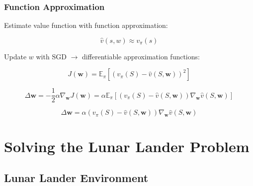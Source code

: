 \documentclass{beamer}
\begin{document}
\begin{frame}
\frametitle{Function Approximation}

Estimate value function with function approximation:

$$
\hat{v}(s, w) \approx v_{\pi}(s)
$$

Update $w$ with SGD $\rightarrow$ differentiable 
approximation functions:

$$
J(\mathbf{w})=\mathbb{E}_{\pi}\left[\left(v_{\pi}(S)-\hat{v}(S, \mathbf{w})\right)^{2}\right]
$$

$$
\Delta \mathbf{w} =-\frac{1}{2} \alpha \nabla_{\mathbf{w}} J(\mathbf{w})
 =\alpha \mathbb{E}_{\pi}\left[\left(v_{\pi}(S)-\hat{v}(S, \mathbf{w})\right) \nabla_{\mathbf{w}} \hat{v}(S, \mathbf{w})\right] 
$$

$$
\Delta \mathbf{w}=\alpha\left(v_{\pi}(S)-\hat{v}(S, \mathbf{w})\right) \nabla_{\mathbf{w}} \hat{v}(S, \mathbf{w})
$$

\end{frame}



\section{Solving the Lunar Lander Problem}

\subsection{Lunar Lander Environment}
\end{document}
